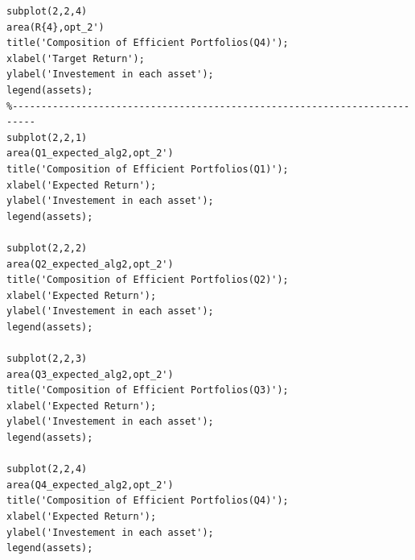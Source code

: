 \documentclass[11pt,a4paper]{article}
\begin{document}
\begin{lstlisting}
subplot(2,2,4)
area(R{4},opt_2')
title('Composition of Efficient Portfolios(Q4)');
xlabel('Target Return');
ylabel('Investement in each asset');
legend(assets);
%--------------------------------------------------------------------------
subplot(2,2,1)
area(Q1_expected_alg2,opt_2')
title('Composition of Efficient Portfolios(Q1)');
xlabel('Expected Return');
ylabel('Investement in each asset');
legend(assets);

subplot(2,2,2)
area(Q2_expected_alg2,opt_2')
title('Composition of Efficient Portfolios(Q2)');
xlabel('Expected Return');
ylabel('Investement in each asset');
legend(assets);

subplot(2,2,3)
area(Q3_expected_alg2,opt_2')
title('Composition of Efficient Portfolios(Q3)');
xlabel('Expected Return');
ylabel('Investement in each asset');
legend(assets);

subplot(2,2,4)
area(Q4_expected_alg2,opt_2')
title('Composition of Efficient Portfolios(Q4)');
xlabel('Expected Return');
ylabel('Investement in each asset');
legend(assets);
\end{lstlisting}
\end{document}
